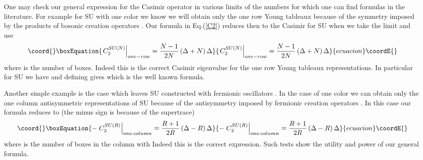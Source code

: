 \documentclass[a4paper,aps,preprint,nofootinbib]{revtex4}
\begin{document}
One may check our general expression for the Casimir operator in
various limits of the numbers \coordHE{} for which one can find
formulas in the literature. For example for SU\coordHE{}
with one color \coordHE{} we know we will obtain only the one row Young
tableaux because of the symmetry imposed by the products of
bosonic creation operators \coordHE{}. Our formula in Eq.(\ref{C2})
reduces then to the Casimir for SU\coordHE{} when we take
the limit \coordHE{} and use \coordHE{}
\begin{equation}\coord{}\boxEquation{
\left. C_{2}^{SU\left( N\right) }\right\vert _{one-row}=\frac{N-1}{2N}
\left( \Delta+N\right) \Delta
}{
\left. C_{2}^{SU\left( N\right) }\right\vert _{one-row}=\frac{N-1}{2N}
\left( \Delta+N\right) \Delta
}{ecuacion}\coordE{}\end{equation}
where \coordHE{} is the number of boxes. Indeed this is the correct
Casimir eigenvalue for the one row Young tableaux representations. In
particular for SU\myHighlight{$\left( 2\right) $}\coordHE{} we have \coordHE{} and defining \coordHE{}
gives \coordHE{} which is the well
known formula.

Another simple example is the case \coordHE{} which leaves SU\coordHE{} constructed with fermionic oscillators \coordHE{}. In the case of one
color \coordHE{} we can obtain only the one column antisymmetric representations
of SU\coordHE{} because of the antisymmetry imposed by fermionic
creation operators \coordHE{}. In this case our formula reduces to (the minus sign
is because of the supertrace)%
\begin{equation}\coord{}\boxEquation{
-\left. C_{2}^{SU\left( R\right) }\right\vert _{one\text{-}column}=\frac{R+1
}{2R}\left( \Delta-R\right) \Delta
}{
-\left. C_{2}^{SU\left( R\right) }\right\vert _{one\text{-}column}=\frac{R+1
}{2R}\left( \Delta-R\right) \Delta
}{ecuacion}\coordE{}\end{equation}
where \coordHE{} is the number of boxes in the column with \coordHE{} Indeed this is the correct expression. Such tests show the utility
and power of our general formula.
\end{document}
